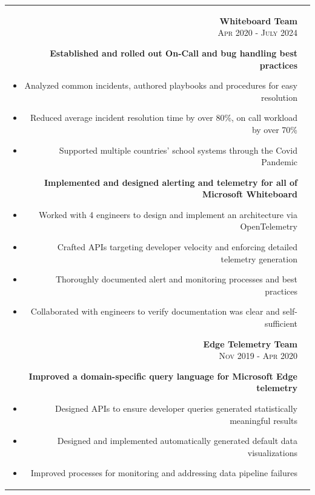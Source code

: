 \documentclass[letterpaper,10pt]{article} %
\begin{document}
\begin{tabular}{r|p{14.5cm}}
{%
}
{\textbf{ Whiteboard Team}
\\
 \textsc{Apr 2020 - July 2024}}{
\textbf{Established and rolled out On-Call and bug handling best practices}
\begin{itemize}
	\item{Analyzed common incidents, authored playbooks and procedures for easy resolution}
	\item{Reduced average incident resolution time by over 80\%, on call workload by over 70\%}
	\item{Supported multiple countries' school systems through the Covid Pandemic}
\end{itemize}

\textbf{Implemented and designed alerting and telemetry for all of Microsoft Whiteboard}
\begin{itemize}
	\item{Worked with 4 engineers to design and implement an architecture via OpenTelemetry}
	\item{Crafted APIs targeting developer velocity and enforcing detailed telemetry generation}
	\item{Thoroughly documented alert and monitoring processes and best practices }
	\item{Collaborated with engineers to verify documentation was clear and self-sufficient }
\end{itemize}

}
{\textbf{ Edge Telemetry Team } 
\\
 \textsc{Nov 2019 - Apr 2020}}{
\textbf{Improved a domain-specific query language for Microsoft Edge telemetry}
\begin{itemize}
	\item{Designed APIs to ensure developer queries generated statistically meaningful results}
	\item{Designed and implemented automatically generated default data visualizations}
	\item{Improved processes for monitoring and addressing data pipeline failures}
\end{itemize}

}
\end{tabular}
\end{document}

